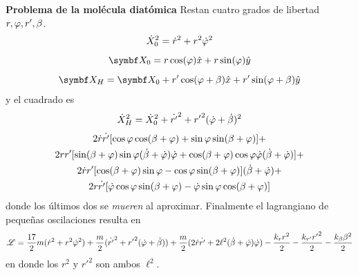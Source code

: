 \documentclass[10pt,oneside]{CBFT_book}
\begin{document}
\begin{ejemplo}{\bf Problema de la molécula diatómica}
Restan cuatro grados de libertad $r, \varphi, r', \beta$.
\[
	\dot{X}_0^2 = \dot{r}^2 + r^2 \dot{\varphi}^2
\]
\[
	\vb{X}_0 = r \cos (\vp) \hat{x} + r \sin (\vp) \hat{y}
\]
\[
	\vb{X}_H = \vb{X}_0 + r' \cos (\vp + \beta) \hat{x} + r' \sin (\vp + \beta) \hat{y}
\]
y el cuadrado es
\[
	\dot{X}_H^2 = \dot{X}_0^2 + \dot{r'}^2 + {r'}^2 ( \dot{\varphi} + \dot{\beta} )^2
\]
\begin{multline}
	2 \dot{r} \dot{r'} [ \cos \varphi \cos (\beta + \varphi) + \sin\varphi \sin(\beta + \varphi) ] + \\
	2 {r} {r'} [ \sin(\beta + \varphi) \sin\varphi (\dot{\beta} + \dot{\varphi}) \dot{\varphi} + \cos(\beta + \varphi) \cos\varphi \dot{\varphi} (\dot{\beta} + \dot{\varphi}) ] + \\
	2 \dot{r} {r'} [ \cos (\beta + \varphi) \sin \varphi - \cos \varphi \sin (\beta + \varphi)] (\dot{\beta} + \dot{\varphi}) + \\
	2 {r} \dot{r'} [ \dot{\varphi} \cos\varphi \sin(\beta + \varphi) - \dot{\varphi} \sin\varphi \cos (\beta + \varphi)] 
\end{multline}
donde los últimos dos se {\it mueren} al aproximar.
Finalmente el lagrangiano de pequeñas oscilaciones resulta en
\[
	\mathscr{L} = \frac {17} 2 m ( \dot{r}^2 + r^2 \dot{\varphi}^2 ) + 
	\frac m 2 ( \dot{r'}^2 + {r'}^2( \dot{\varphi} + \dot{\beta} ) ) +
	\frac m 2 ( 2 \dot{r} \dot{r'} + 2 \ell^2 ( \dot{\beta} + \dot{\varphi} ) \dot{\varphi} ) - 
	\frac{k_r r^2}{2} - \frac{k_{r'} {r'}^2}{2} - \frac{k_\beta \beta^2}{2}
\]
en donde los $r^2$ y ${r'}^2$ son ambos $\ell^2$.
\end{ejemplo}


\end{document}

